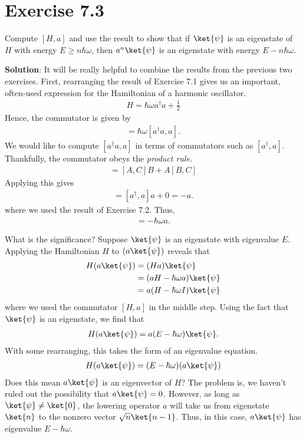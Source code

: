\documentclass{book}
\begin{document}
\section*{Exercise 7.3}
    Compute $[H, a]$ and use the result to show that if $\ket{\psi}$ is an eigenstate of $H$ with energy $E \geq n\hbar \omega$, then $a^n \ket{\psi}$ is an eigenstate with energy $E - n\hbar \omega$.

    \textbf{Solution}: It will be really helpful to combine the results from the previous two exercises. First, rearranging the result of Exercise 7.1 gives us an important, often-used expression for the Hamiltonian of a harmonic oscillator.
    \begin{align}
        H = \hbar \omega a^\dagger a + \frac{1}{2}
    \end{align}
    Hence, the commutator is given by
    \begin{align}
        [H, a] = \hbar \omega [a^\dagger a , a].
    \end{align}
    We would like to compute $[a^\dagger a, a]$ in terms of commutators such as $[a^\dagger, a]$. Thankfully, the commutator obeys the \emph{product rule}. 
    \begin{align}
        [AB, C] = [A, C]B + A[B,C]
    \end{align}
    Applying this gives
    \begin{align}
        [a^\dagger a, a] = [a^\dagger, a] a + 0 = -a.
    \end{align}
    where we used the result of Exercise 7.2. Thus,
    \begin{align}
        [H,a] = -\hbar\omega a.
    \end{align}

    What is the significance? Suppose $\ket{\psi}$ is an eigenstate with eigenvalue $E$. Applying the Hamiltonian $H$ to $(a\ket{\psi})$ reveals that
    \begin{align}
    \begin{aligned}
        H (a\ket{\psi}) &= (Ha) \ket{\psi} \\
        &= (aH - \hbar \omega a)\ket{\psi} \\
        &= a(H- \hbar \omega I) \ket{\psi}
    \end{aligned}
    \end{align}
    where we used the commutator $[H,a]$ in the middle step. Using the fact that $\ket{\psi}$ is an eigenstate, we find that
    \begin{align}
        H(a\ket{\psi}) = a(E-\hbar\omega) \ket{\psi}.
    \end{align}
    With some rearranging, this takes the form of an eigenvalue equation.
    \begin{align}
        H(a\ket{\psi}) = (E-\hbar\omega) (a\ket{\psi})
    \end{align}
    Does this mean $a\ket{\psi}$ is an eigenvector of $H$? The problem is, we haven't ruled out the possibility that $a\ket{\psi} = 0$. However, as long as $\ket{\psi} \neq \ket{0}$, the lowering operator $a$ will take us from eigenstate $\ket{n}$ to the nonzero vector $\sqrt{n} \ket{n-1}$. Thus, in this case, $a\ket{\psi}$ has eigenvalue $E - \hbar \omega$.
\end{document}
